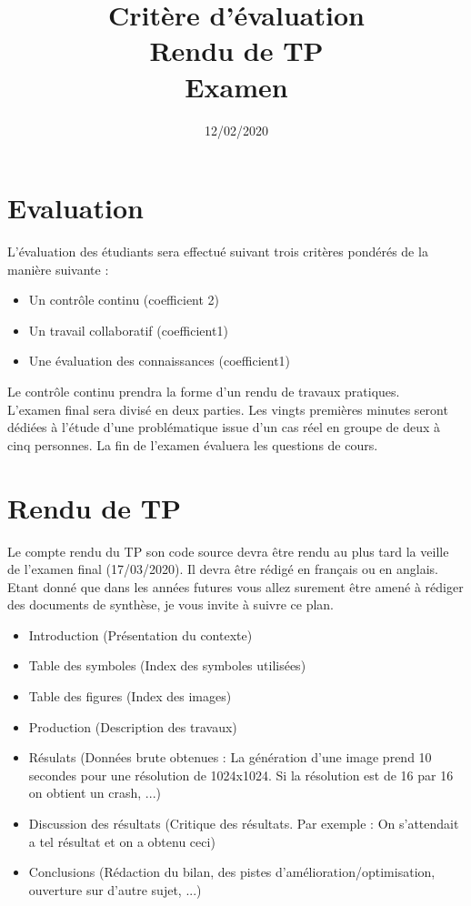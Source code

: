 \documentclass[french,12pt]{article}
\begin{document}
\title{Critère d'évaluation\\Rendu de TP\\Examen}
\date{12/02/2020}
\maketitle

\section{Evaluation}
L'évaluation des étudiants sera effectué suivant trois critères pondérés de la manière suivante :

\begin{itemize}
	\item Un contrôle continu (coefficient 2)
	\item Un travail collaboratif (coefficient1)
	\item Une évaluation des connaissances (coefficient1)
\end{itemize}

Le contrôle continu prendra la forme d'un rendu de travaux pratiques.\\
L'examen final sera divisé en deux parties. Les vingts premières minutes seront dédiées à l'étude d'une problématique issue d'un cas réel en groupe de deux à cinq personnes. La fin de l'examen évaluera les questions de cours.

\section{Rendu de TP}
Le compte rendu du TP son code source devra être rendu au plus tard la veille de l'examen final (17/03/2020). Il devra être rédigé en français ou en anglais. Etant donné que dans les années futures vous allez surement être amené à rédiger des documents de synthèse, je vous invite à suivre ce plan.

\begin{itemize}
	\item Introduction (Présentation du contexte)
	\item Table des symboles (Index des symboles utilisées)
	\item Table des figures (Index des images)
	\item Production (Description des travaux)
	\item Résulats (Données brute obtenues : La génération d'une image prend 10 secondes pour une résolution de 1024x1024. Si la résolution est de 16 par 16 on obtient un crash, ...)
	\item Discussion des résultats (Critique des résultats. Par exemple : On s'attendait a tel résultat et on a obtenu ceci)
	\item Conclusions (Rédaction du bilan, des pistes d'amélioration/optimisation, ouverture sur d'autre sujet, ...)
\end{itemize}
\end{document}

